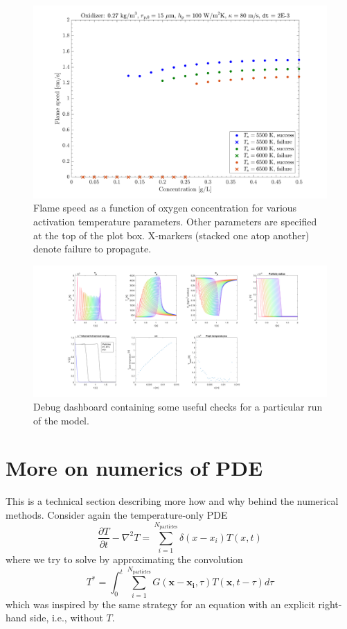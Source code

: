 \documentclass{article}
\begin{document}
\begin{figure}
    \centering
    \includegraphics[width=\textwidth]{./Data/runSet1.png}
    \caption{Flame speed as a function of oxygen concentration for various activation temperature parameters. Other parameters are specified at the top of the plot box. X-markers (stacked one atop another) denote failure to propagate.}
    \label{fig:runSet1}
\end{figure}

\begin{figure}
    \centering
    \includegraphics[width=\textwidth]{./Data/kb_outputSample_73.png}
    \caption{Debug dashboard containing some useful checks for a particular run of the model.}
    \label{fig:dashboard}
\end{figure}

\section{More on numerics of PDE}
\label{sec:morenumerics}

This is a technical section describing more how and why behind the numerical methods. Consider again the temperature-only PDE
\begin{equation}
    \frac{\partial T}{\partial t} - \nabla^2 T = \sum_{i=1}^{N_\mathrm{particles}}\delta(x-x_i) T(x,t)
\end{equation}
where we try to solve by approximating the convolution
\begin{equation}
    T^* = \int_0^t \sum_{i=1}^{N_\mathrm{particles}} G(\mathbf{x}-\mathbf{x_i},\tau) T(\mathbf{x}, t-\tau) d\tau
\label{eqn:fulltoy}
\end{equation}
which was inspired by the same strategy for an equation with an explicit right-hand side, i.e., without $T$.
\end{document}
